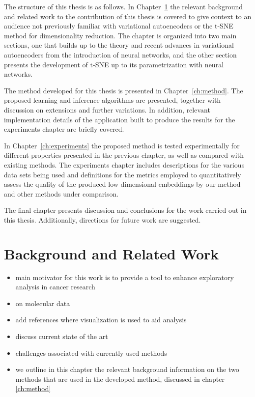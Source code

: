 The structure of this thesis is as follows. In Chapter~\ref{ch:background_and_related_work} the relevant background and related work to the contribution of this thesis is covered to give context to an audience not previously familiar with variational autoencoders or the t-SNE method for dimensionality reduction. The chapter is organized into two main sections, one that builds up to the theory and recent advances in variational autoencoders from the introduction of neural networks, and the other section presents the development of t-SNE up to its parametrization with neural networks.

The method developed for this thesis is presented in Chapter~\ref{ch:method}. The proposed learning and inference algorithms are presented, together with discussion on extensions and further variations. In addition, relevant implementation details of the application built to produce the results for the experiments chapter are briefly covered.

In Chapter~\ref{ch:experiments} the proposed method is tested experimentally for different properties presented in the previous chapter, as well as compared with existing methods. The experiments chapter includes descriptions for the various data sets being used and definitions for the metrics employed to quantitatively assess the quality of the produced low dimensional embeddings by our method and other methods under comparison.

The final chapter presents discussion and conclusions for the work carried out in this thesis. Additionally, directions for future work are suggested.

\chapter{Background and Related Work}
\label{ch:background_and_related_work}

\begin{itemize}
\item main motivator for this work is to provide a tool to enhance exploratory analysis in cancer research
\item on molecular data
\item add references where visualization is used to aid analysis
\item discuss current state of the art
\item challenges associated with currently used methods
\item we outline in this chapter the relevant background information on the two methods that are used in the developed method, discussed in chapter \ref{ch:method}
\end{itemize}

